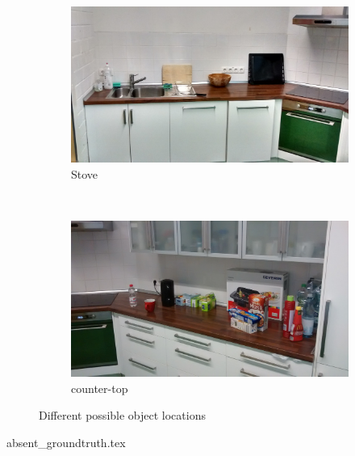\documentclass{article}
\begin{document}
{\begin{figure}
\begin{subfigure}[b]{0.3\textwidth}
        \includegraphics[width=\textwidth]{images/stove.jpg}
        \caption{Stove}
        \label{fig:stove}
    \end{subfigure}
    ~ %
    \begin{subfigure}[b]{0.3\textwidth}
        \includegraphics[width=\textwidth]{images/counter-top.jpg}
        \caption{counter-top}
        \label{fig:counter-top}
    \end{subfigure}
    \caption{Different possible object locations}\label{fig:alllocations}
\end{figure}absent_groundtruth.tex}
\end{document}
